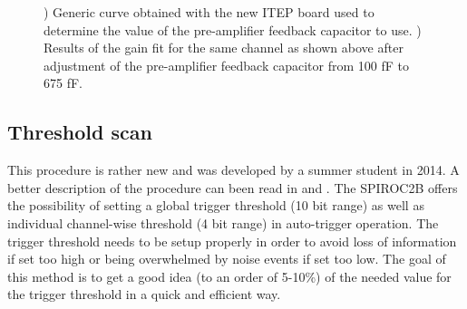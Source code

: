 \begin{figure}[htbp!]
\begin{subfigure}[t]{0.49\textwidth}
    \caption{} \label{fig:Gain675fF}
  \end{subfigure}
  \caption{) Generic curve obtained with the new ITEP board used to determine the value of the pre-amplifier feedback capacitor to use. ) Results of the gain fit for the same channel as shown above after adjustment of the pre-amplifier feedback capacitor from 100 fF to 675 fF.}
\end{figure}

\subsection{Threshold scan}

This procedure is rather new and was developed by a summer student in 2014. A better description of the procedure can been read in \cite{Hartbrich:2016bbz} and \cite{LloydTrigger}. The SPIROC2B offers the possibility of setting a global trigger threshold (10 bit range) as well as individual channel-wise threshold (4 bit range) in auto-trigger operation. The trigger threshold needs to be setup properly in order to avoid loss of information if set too high or being overwhelmed by noise events if set too low. The goal of this method is to get a good idea (to an order of 5-10\%) of the needed value for the trigger threshold in a quick and efficient way.

